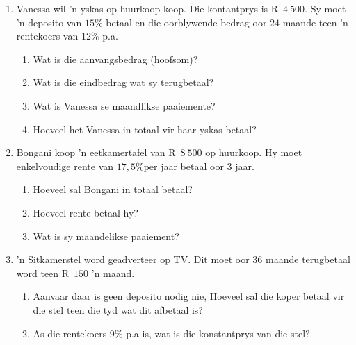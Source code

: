 \begin{exercises}{}{
    \begin{enumerate}[label=\textbf{\arabic*}.]
	\item Vanessa wil 'n yskas op huurkoop koop. Die kontantprys is R~$4~500$. Sy moet 'n deposito van $15\%$ betaal en die oorblywende bedrag oor $24$ maande teen 'n rentekoers van $12\%$ p.a.
	\begin{enumerate}
	    \item Wat is die aanvangsbedrag (hoofsom)?
	    \item Wat is die eindbedrag wat sy terugbetaal?
	    \item Wat is Vanessa se maandlikse paaiemente?
	    \item Hoeveel het Vanessa in totaal vir haar yskas betaal?
	\end{enumerate}


	\item Bongani koop ’n eetkamertafel van R~$8~500$ op huurkoop. Hy moet enkelvoudige rente van $17,5\%$per jaar betaal oor 3 jaar.
	\begin{enumerate}
	    \item Hoeveel sal Bongani in totaal betaal?
	    \item  Hoeveel rente betaal hy?
	    \item Wat is sy maandelikse paaiement?
	\end{enumerate}

	\item 'n Sitkamerstel word geadverteer op TV. Dit moet oor $36$ maande terugbetaal word teen R~$150$ 'n maand.
	\begin{enumerate}
	    \item Aanvaar daar is geen deposito nodig nie, Hoeveel sal die koper betaal vir die stel teen die tyd wat dit afbetaal is?
	    \item As die rentekoers $9\%$ p.a is, wat is die konstantprys van die stel?\\
	\end{enumerate}
    \end{enumerate}
}
\end{exercises}


